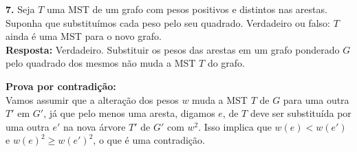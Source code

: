 
\noindent\textbf{7.} Seja $T$ uma MST de um grafo com pesos positivos e distintos nas arestas. Suponha que substituímos cada peso pelo seu quadrado. Verdadeiro ou falso: $T$ ainda é uma MST para o novo grafo.\\[6pt]
\textbf{Resposta:} Verdadeiro. Substituir os pesos das arestas em um grafo ponderado $G$ pelo quadrado dos mesmos não muda a MST $T$ do grafo.

\textbf{Prova por contradição:}\\
Vamos assumir que a alteração dos pesos $w$ muda a MST $T$ de $G$ para uma outra $T'$ em $G'$, já que pelo menos uma aresta, digamos $e$, de $T$ deve ser substituída por uma outra $e'$ na nova árvore $T'$ de $G'$ com $w^2$. Isso implica que $w(e) < w(e')$ e $w(e)^2 \geq w(e')^2$, o que é uma contradição.\\[6pt]